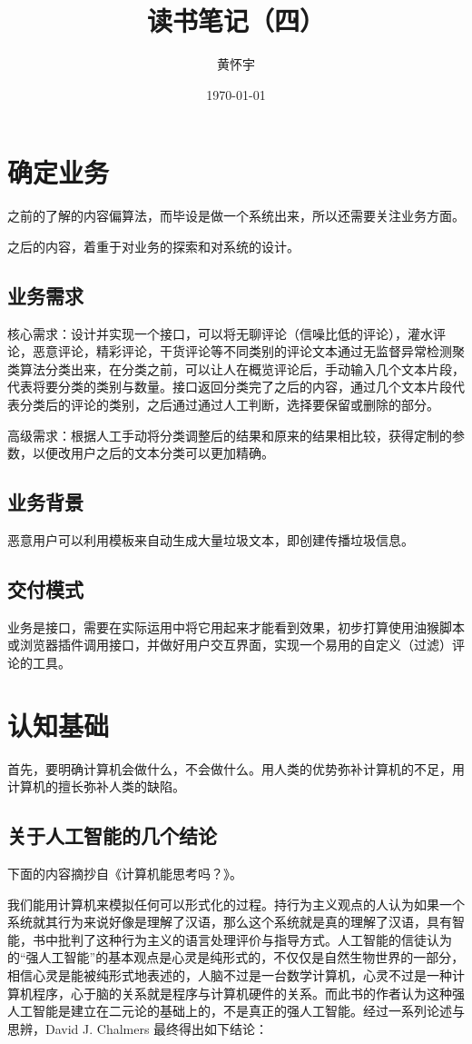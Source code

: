 \documentclass[UTF8]{ctexart}
\title{读书笔记（四）}
\author{黄怀宇}
\date{\today}
\begin{document}
\maketitle

\section{确定业务}
之前的了解的内容偏算法，而毕设是做一个系统出来，所以还需要关注业务方面。

之后的内容，着重于对业务的探索和对系统的设计。

\subsection{业务需求}
核心需求：设计并实现一个接口，可以将无聊评论（信噪比低的评论），灌水评论，恶意评论，精彩评论，干货评论等不同类别的评论文本通过无监督异常检测聚类算法分类出来，在分类之前，可以让人在概览评论后，手动输入几个文本片段，代表将要分类的类别与数量。接口返回分类完了之后的内容，通过几个文本片段代表分类后的评论的类别，之后通过通过人工判断，选择要保留或删除的部分。

高级需求：根据人工手动将分类调整后的结果和原来的结果相比较，获得定制的参数，以便改用户之后的文本分类可以更加精确。

\subsection {业务背景}
恶意用户可以利用模板来自动生成大量垃圾文本，即创建传播垃圾信息。\cite{ljlw1}

\subsection{交付模式}
业务是接口，需要在实际运用中将它用起来才能看到效果，初步打算使用油猴脚本或浏览器插件调用接口，并做好用户交互界面，实现一个易用的自定义（过滤）评论的工具。

\section{认知基础}
首先，要明确计算机会做什么，不会做什么。用人类的优势弥补计算机的不足，用计算机的擅长弥补人类的缺陷。
\subsection{关于人工智能的几个结论}
下面的内容摘抄自《计算机能思考吗？》。

我们能用计算机来模拟任何可以形式化的过程。持行为主义观点的人认为如果一个系统就其行为来说好像是理解了汉语，那么这个系统就是真的理解了汉语，具有智能，书中批判了这种行为主义的语言处理评价与指导方式。人工智能的信徒认为的“强人工智能”的基本观点是心灵是纯形式的，不仅仅是自然生物世界的一部分，相信心灵是能被纯形式地表述的，人脑不过是一台数学计算机，心灵不过是一种计算机程序，心于脑的关系就是程序与计算机硬件的关系。而此书的作者认为这种强人工智能是建立在二元论的基础上的，不是真正的强人工智能。经过一系列论述与思辨，David J. Chalmers 最终得出如下结论：
\end{document}
